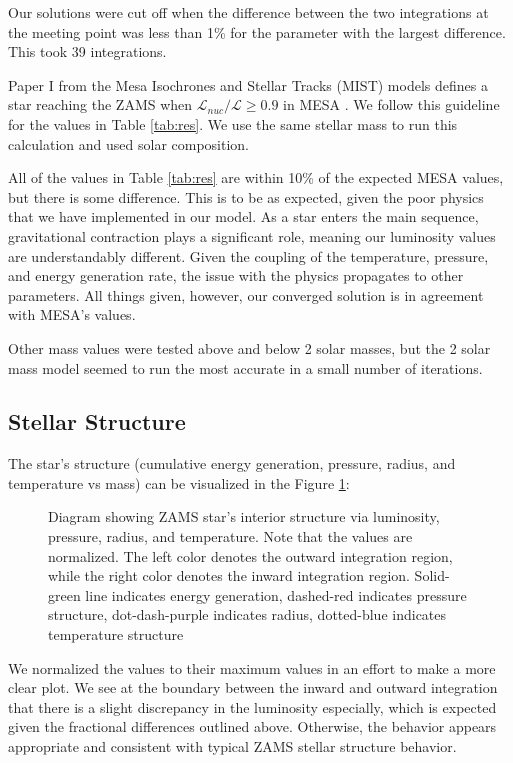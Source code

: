 \documentclass[twocolumn]{aastex631}
\begin{document}
Our solutions were cut off when the difference between the two integrations at the meeting point was less than 1\% for the parameter with the largest difference. This took 39 integrations.

Paper I from the Mesa Isochrones and Stellar Tracks (MIST) models defines a star reaching the ZAMS when $\mathcal{L}_{nuc}/\mathcal{L} \geq 0.9$ in MESA \citep{mist}. We follow this guideline for the values in Table \ref{tab:res}. We use the same stellar mass to run this calculation and used solar composition.


All of the values in Table \ref{tab:res} are within 10\% of the expected MESA values, but there is some difference. This is to be as expected, given the poor physics that we have implemented in our model. As a star enters the main sequence, gravitational contraction plays a significant role, meaning our luminosity values are understandably different. Given the coupling of the temperature, pressure, and energy generation rate, the issue with the physics propagates to other parameters. All things given, however, our converged solution is in agreement with MESA's values.

Other mass values were tested above and below 2 solar masses, but the 2 solar mass model seemed to run the most accurate in a small number of iterations.

\subsection{Stellar Structure}

The star's structure (cumulative energy generation, pressure, radius, and temperature vs mass) can be visualized in the Figure \ref{fig:tot}: 

\begin{figure}[ht!]
	\label{fig:tot}
	\caption{Diagram showing ZAMS star's interior structure via luminosity, pressure, radius, and temperature. Note that the values are normalized. The left color denotes the outward integration region, while the right color denotes the inward integration region. Solid-green line indicates energy generation, dashed-red indicates pressure structure, dot-dash-purple indicates radius, dotted-blue indicates temperature structure}
\end{figure}

We normalized the values to their maximum values in an effort to make a more clear plot. We see at the boundary between the inward and outward integration that there is a slight discrepancy in the luminosity especially, which is expected given the fractional differences outlined above. Otherwise, the behavior appears appropriate and consistent with typical ZAMS stellar structure behavior.
\end{document}

